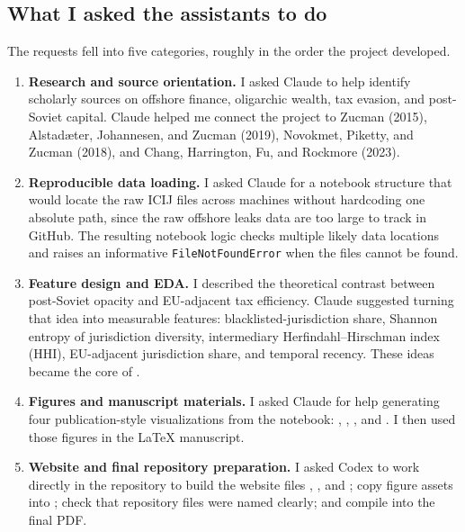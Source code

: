 \documentclass[9pt,twoside]{pnas-new}
\begin{document}
\subsection*{What I asked the assistants to do}

The requests fell into five categories, roughly in the order the project developed.

\begin{enumerate}
  \item \textbf{Research and source orientation.} I asked Claude to help identify scholarly sources on offshore finance, oligarchic wealth, tax evasion, and post-Soviet capital. Claude helped me connect the project to Zucman (2015), Alstad{\ae}ter, Johannesen, and Zucman (2019), Novokmet, Piketty, and Zucman (2018), and Chang, Harrington, Fu, and Rockmore (2023).
  \item \textbf{Reproducible data loading.} I asked Claude for a notebook structure that would locate the raw ICIJ files across machines without hardcoding one absolute path, since the raw offshore leaks data are too large to track in GitHub. The resulting notebook logic checks multiple likely data locations and raises an informative \texttt{FileNotFoundError} when the files cannot be found.
  \item \textbf{Feature design and EDA.} I described the theoretical contrast between post-Soviet opacity and EU-adjacent tax efficiency. Claude suggested turning that idea into measurable features: blacklisted-jurisdiction share, Shannon entropy of jurisdiction diversity, intermediary Herfindahl--Hirschman index (HHI), EU-adjacent jurisdiction share, and temporal recency. These ideas became the core of .
  \item \textbf{Figures and manuscript materials.} I asked Claude for help generating four publication-style visualizations from the notebook: , , , and . I then used those figures in the LaTeX manuscript.
  \item \textbf{Website and final repository preparation.} I asked Codex to work directly in the repository to build the website files , , and ; copy figure assets into ; check that repository files were named clearly; and compile  into the final PDF.
\end{enumerate}
\end{document}
